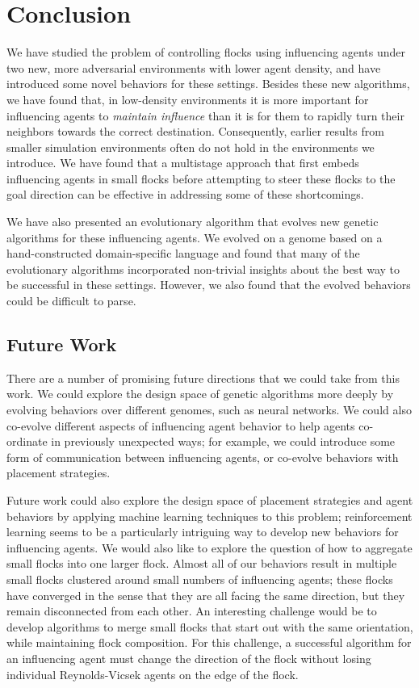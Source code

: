 \chapter{Conclusion}
\label{ch:conclusion}

We have studied the problem of controlling flocks using influencing agents
under two new, more adversarial environments with lower agent density, and
have introduced some novel behaviors for these settings.
Besides these new algorithms, we have found that, in low-density
environments it is more important for influencing agents to
\textit{maintain influence} than it is for them to rapidly turn their
neighbors towards the correct destination.
Consequently, earlier results from smaller simulation environments often do
not hold in the environments we introduce.
We have found that a multistage approach that first embeds influencing
agents in small flocks before attempting to steer these flocks to the goal
direction can be effective in addressing some of these shortcomings.

We have also presented an evolutionary algorithm that evolves new genetic
algorithms for these influencing agents.
We evolved on a genome based on a hand-constructed domain-specific language
and found that many of the evolutionary algorithms incorporated non-trivial
insights about the best way to be successful in these settings.
However, we also found that the evolved behaviors could be difficult to parse.

\section*{Future Work}
There are a number of promising future directions that we could take from this
work.
We could explore the design space of genetic algorithms more deeply by
evolving behaviors over different genomes, such as neural networks.
We could also co-evolve different aspects of influencing agent behavior to help
agents co-ordinate in previously unexpected ways; for example, we could
introduce some form of communication between influencing agents, or co-evolve
behaviors with placement strategies.

Future work could also explore the design space of placement strategies and
agent behaviors by applying machine learning techniques to this problem;
reinforcement learning seems to be a particularly intriguing way to develop new
behaviors for influencing agents.
We would also like to explore the question of how to aggregate small flocks
into one larger flock.
Almost all of our behaviors result in multiple small flocks clustered around
small numbers of influencing agents; these flocks have converged in the sense
that they are all facing the same direction, but they remain disconnected from
each other.
An interesting challenge would be to develop algorithms to merge small flocks
that start out with the same orientation, while maintaining flock composition.
For this challenge, a successful algorithm for an influencing agent must change
the direction of the flock without losing individual Reynolds-Vicsek agents on
the edge of the flock.

